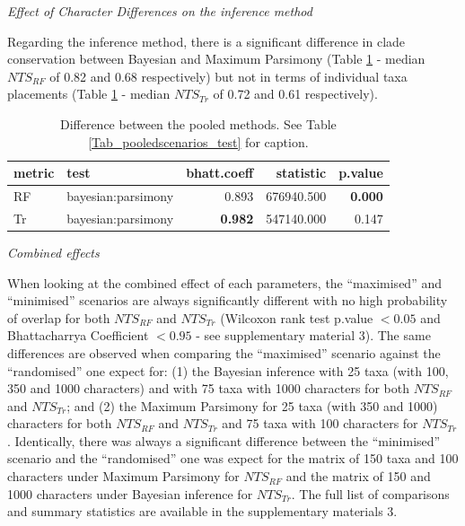 \documentclass[12pt,letterpaper]{article}
\renewcommand{\subsection}[1]{%
\bigskip
\begin{center}
\begin{large}
\normalfont\itshape #1
\end{large}
\end{center}}
\begin{document}
\subsection{Effect of Character Differences on the inference method}

Regarding the inference method, there is a significant difference in clade conservation between Bayesian and Maximum Parsimony (Table \ref{Tab_pooledsmethods_test} - median $NTS_{RF}$ of 0.82 and 0.68 respectively) but not in terms of individual taxa placements (Table \ref{Tab_pooledsmethods_test} - median $NTS_{Tr}$ of 0.72 and 0.61 respectively).

\begin{table}[ht]
\centering
\begin{tabular}{llrrr}
  \hline
metric & test & bhatt.coeff & statistic & p.value \\ 
  \hline
RF & bayesian:parsimony & 0.893 & 676940.500 & \textbf{0.000} \\ 
Tr & bayesian:parsimony & \textbf{0.982} & 547140.000 & 0.147 \\ 
   \hline
\end{tabular}
\caption{Difference between the pooled methods. See Table \ref{Tab_pooledscenarios_test} for caption.} 
\label{Tab_pooledsmethods_test}
\end{table}

\subsection{Combined effects}

When looking at the combined effect of each parameters, the ``maximised'' and ``minimised'' scenarios are always significantly different with no high probability of overlap for both $NTS_{RF}$ and $NTS_{Tr}$ (Wilcoxon rank test p.value $<0.05$ and Bhattacharrya Coefficient $<0.95$ - see supplementary material 3).
The same differences are observed when comparing the ``maximised'' scenario against the ``randomised'' one expect for: (1) the Bayesian inference with 25 taxa (with 100, 350 and 1000 characters) and with 75 taxa with 1000 characters for both $NTS_{RF}$ and $NTS_{Tr}$; and (2) the Maximum Parsimony for 25 taxa (with 350 and 1000) characters for both $NTS_{RF}$ and $NTS_{Tr}$ and 75 taxa with 100 characters for $NTS_{Tr}$.
Identically, there was always a significant difference between the ``minimised'' scenario and the ``randomised'' one was expect for the matrix of 150 taxa and 100 characters under Maximum Parsimony for $NTS_{RF}$ and the matrix of 150 and 1000 characters under Bayesian inference for $NTS_{Tr}$.
The full list of comparisons and summary statistics are available in the supplementary materials 3.
\end{document}

